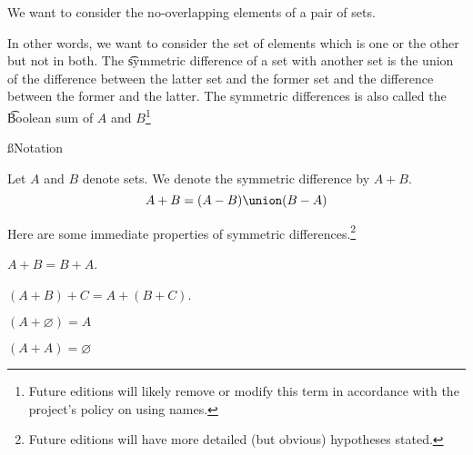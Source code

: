 

We want to consider the no-overlapping elements of a pair of sets.


In other words, we want to consider the set of elements which is one or the other but not in both.
The \t{symmetric difference} of a set with another set is the union of the difference between the latter set and the former set and the difference between the former and the latter.
The symmetric differences is also called the \t{Boolean sum} of $A$ and $B$\footnote{Future editions will likely remove or modify this term in accordance with the project's policy on using names.}

\ss{Notation}

Let $A$ and $B$ denote sets.
We denote the symmetric difference by $A + B$.
\[
  A + B = (A - B) \union (B - A)
\]


Here are some immediate properties of symmetric differences.\footnote{Future editions will have more detailed (but obvious) hypotheses stated.}

\begin{proposition}[Commutative]
  $A + B = B + A$.
\end{proposition}

\begin{proposition}[Associative]
  $(A + B) + C = A + (B + C)$.
\end{proposition}

\begin{proposition}[Identity]
  $(A + \varnothing) = A$
\end{proposition}

\begin{proposition}[Inverse]
  $(A + A) = \varnothing$
\end{proposition}